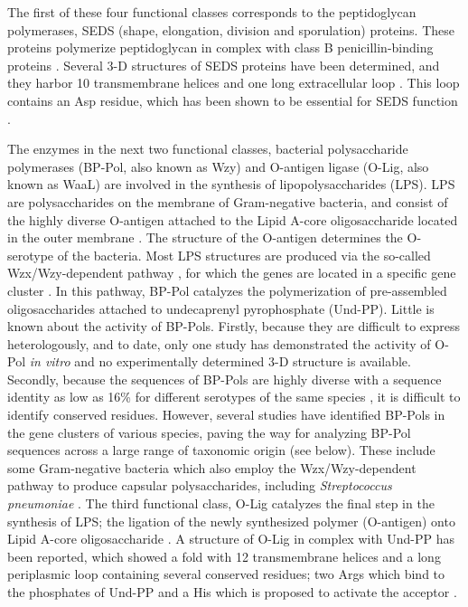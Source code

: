 \documentclass{article}
\begin{document}
The first of these four functional classes corresponds to the peptidoglycan polymerases, SEDS (shape, elongation, division and sporulation) proteins. These proteins polymerize peptidoglycan in complex with class B penicillin-binding proteins \cite{cho_assembly_2023}. Several 3-D structures of SEDS proteins have been determined, and they harbor 10 transmembrane helices and one long extracellular loop \cite{sjodt_structure_2018, kashammer_cryo-em_2023, nygaard_structural_2023}. This loop contains an Asp residue, which has been shown to be essential for SEDS function \cite{sjodt_structure_2018, meeske_seds_2016}.

The enzymes in the next two functional classes, bacterial polysaccharide polymerases (BP-Pol, also known as Wzy) and O-antigen ligase (O-Lig, also known as WaaL) are involved in the synthesis of lipopolysaccharides (LPS). LPS are polysaccharides on the membrane of Gram-negative bacteria, and consist of the highly diverse O-antigen attached to the Lipid A-core oligosaccharide located in the outer membrane \cite{di_lorenzo_journey_2022}. The structure of the O-antigen determines the O-serotype of the bacteria. Most LPS structures are produced via the so-called Wzx/Wzy-dependent pathway \cite{islam_synthesis_2014, whitfield_assembly_2020}, for which the genes are located in a specific gene cluster \cite{islam_synthesis_2014}. In this pathway, BP-Pol catalyzes the polymerization of pre-assembled oligosaccharides attached to undecaprenyl pyrophosphate (Und-PP). Little is known about the activity of BP-Pols. Firstly, because they are difficult to express heterologously, and to date, only one study has demonstrated the activity of O-Pol \textit{in vitro} \cite{woodward_vitro_2010} and no experimentally determined 3-D structure is available. Secondly, because the sequences of BP-Pols are highly diverse with a sequence identity as low as 16\% for different serotypes of the same species \cite{islam_synthesis_2014}, it is difficult to identify conserved residues. However, several studies have identified BP-Pols in the gene clusters of various species, paving the way for analyzing BP-Pol sequences across a large range of taxonomic origin (see below). These include some Gram-negative bacteria which also employ the Wzx/Wzy-dependent pathway to produce capsular polysaccharides, including \textit{Streptococcus pneumoniae} \cite{bentley_genetic_2006}.
The third functional class, O-Lig catalyzes the final step in the synthesis of LPS; the ligation of the newly synthesized polymer (O-antigen) onto Lipid A-core oligosaccharide \cite{ruan_waal_2012}. A structure of O-Lig in complex with Und-PP has been reported, which showed a fold with 12 transmembrane helices and a long periplasmic loop containing several conserved residues; two Args which bind to the phosphates of Und-PP and a His which is proposed to activate the acceptor \cite{ashraf_structural_2022}.
\end{document}
